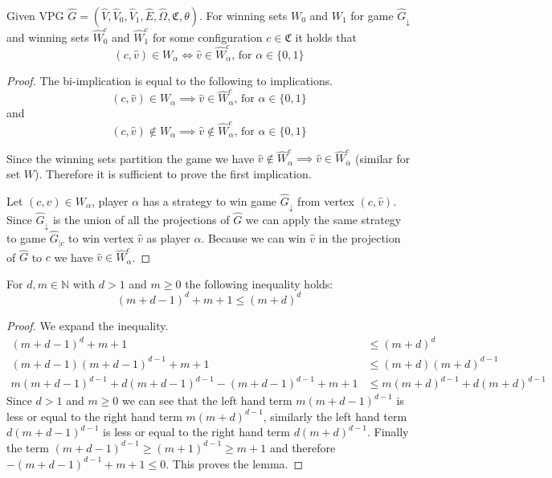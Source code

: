 \begin{theorem}
	\label{theA_solve_UVPG_is_solve_VPG}
	Given VPG $\hat{G} =  (\hat{V},\hat{V}_0,\hat{V}_1, \hat{E},\hat{\Omega}, \mathfrak{C},\theta)$. For winning sets $W_0$ and $W_1$ for game $\hat{G}_{\downarrow}$ and winning sets $\hat{W}^c_0$ and $\hat{W}^c_1$ for some configuration $c \in \mathfrak{C}$ it holds that
	\[(c,\hat{v}) \in W_\alpha \iff \hat{v} \in \hat{W}^c_\alpha  \text{, for }\alpha \in \{0,1\}  \]
	\begin{proof}
		The bi-implication is equal to  the following to implications.
		\[ (c,\hat{v}) \in W_\alpha \implies \hat{v} \in \hat{W}^c_\alpha  \text{, for }\alpha \in \{0,1\} \]
		and
		\[ (c,\hat{v}) \notin W_\alpha\implies \hat{v} \notin \hat{W}^c_\alpha \text{, for }\alpha \in \{0,1\}  \]
		
		Since the winning sets partition the game we have $\hat{v} \notin \hat{W}^c_\alpha \implies \hat{v} \in \hat{W}^c_{\overline{\alpha}}$ (similar for set $W$). Therefore it is sufficient to prove the first implication.
		
		Let $(c,\hat{v}) \in W_\alpha$, player $\alpha$ has a strategy to win game $\hat{G}_{\downarrow}$ from vertex $(c,\hat{v})$. Since $\hat{G}_{\downarrow}$ is the union of all the projections of $\hat{G}$ we can apply the same strategy to game $\hat{G}_{|c}$ to win vertex $\hat{v}$ as player $\alpha$. Because we can win $\hat{v}$ in the projection of $\hat{G}$ to $c$ we have $\hat{v} \in \hat{W}^c_\alpha$.
	\end{proof}
\end{theorem}

\begin{lemma}
	\label{lem_md_ineq}
	For $d,m \in \mathbb{N}$ with $d>1$ and $m \geq 0$ the following inequality holds:
	\[ (m+d-1)^d + m+1 \leq (m+d)^d \]
	\begin{proof}
		We expand the inequality.
		\begin{align*}
		(m+d-1)^d + m + 1 & \leq (m+d)^d\\
		(m+d-1)(m+d-1)^{d-1} + m + 1 & \leq (m+d)(m+d)^{d-1}\\
		m(m+d-1)^{d-1} + d(m+d-1)^{d-1} - (m+d-1)^{d-1} + m + 1 & \leq m(m+d)^{d-1} + d(m+d)^{d-1}
		\end{align*}
		Since $d > 1$ and $m \geq 0$ we can see that the left hand term $m(m+d-1)^{d-1}$ is less or equal to the right hand term $m(m+d)^{d-1}$, similarly the left hand term $d(m+d-1)^{d-1}$ is less or equal to the right hand term $d(m+d)^{d-1}$. Finally the term $(m+d-1)^{d-1} \geq (m+1)^{d-1} \geq m+1$ and therefore $- (m+d-1)^{d-1} + m + 1  \leq 0$. This proves the lemma.
	\end{proof}
\end{lemma}
